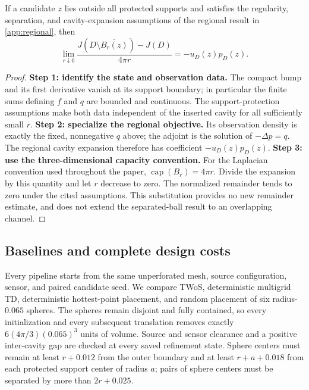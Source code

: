 \begin{proposition}
If a candidate $z$ lies outside all protected supports and satisfies the
regularity, separation, and cavity-expansion assumptions of the regional
result in \cref{app:regional}, then
\[
 \lim_{r\downarrow0}\frac{J(D\setminus\overline{B_r(z)})-J(D)}{4\pi r}
 =-u_D(z)p_D(z).
\]
\end{proposition}
\begin{proof}
\textbf{Step 1: identify the state and observation data.}
The compact bump and its first derivative vanish at its support boundary;
in particular the finite sums defining $f$ and $q$ are bounded and continuous.
The support-protection assumptions make both data independent of the inserted
cavity for all sufficiently small $r$.
\textbf{Step 2: specialize the regional objective.}
Its observation density is exactly the fixed, nonnegative $q$ above; the
adjoint is the solution of $-\Delta p=q$. The regional cavity expansion
therefore has coefficient $-u_D(z)p_D(z)$.
\textbf{Step 3: use the three-dimensional capacity convention.}
For the Laplacian convention used throughout the paper,
$\operatorname{cap}(B_r)=4\pi r$. Divide the expansion by this quantity and
let $r$ decrease to zero. The normalized remainder tends to zero under the
cited assumptions. This substitution provides no new remainder estimate,
and does not extend the separated-ball result to an overlapping channel.
\end{proof}

\subsection{Baselines and complete design costs}
Every pipeline starts from the same unperforated mesh, source configuration,
sensor, and paired candidate seed. We compare TWoS, deterministic multigrid
TD, deterministic hottest-point placement, and random placement of six
radius-$0.065$ spheres. The spheres remain disjoint and fully contained,
so every initialization and every subsequent translation removes exactly
$6(4\pi/3)(0.065)^3$ units of volume. Source and sensor clearance and a positive
inter-cavity gap are checked at every saved refinement state. Sphere centers
must remain at least $r+0.012$ from the outer boundary and at least
$r+a+0.018$ from each protected support center of radius $a$; pairs of
sphere centers must be separated by more than $2r+0.025$.


